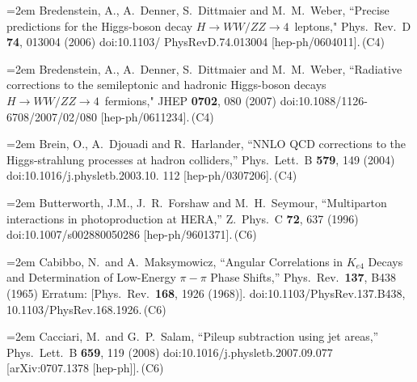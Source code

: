 \documentclass[letter,12pt]{article}
\def\xbibitem#1#2#3{\noindent\hangindent=2em #2\,(#3)}
\begin{document}
\xbibitem{Bredenstein:2006rh}{Bredenstein, A., A.~Denner, S.~Dittmaier and M.~M.~Weber,
  ``Precise predictions for the Higgs-boson decay $H\to WW/ZZ\to 4$\, leptons,"%
  Phys.\ Rev.\ D {\bf 74}, 013004 (2006)
  doi:10.1103/ PhysRevD.74.013004
  [hep-ph/0604011].}{C4}
  
\xbibitem{Bredenstein:2006ha}{Bredenstein, A., A.~Denner, S.~Dittmaier and M.~M.~Weber,
  ``Radiative corrections to the semileptonic and hadronic Higgs-boson decays $H\to WW/ZZ\to 4$\, fermions,"
  JHEP {\bf 0702}, 080 (2007)
  doi:10.1088/1126-6708/2007/02/080
  [hep-ph/0611234].}{C4}

\xbibitem{Brein:2003wg}{Brein, O., A.~Djouadi and R.~Harlander,
  ``NNLO QCD corrections to the Higgs-strahlung processes at hadron colliders,''
  Phys.\ Lett.\ B {\bf 579}, 149 (2004)
  doi:10.1016/j.physletb.2003.10. 112
  [hep-ph/0307206].}{C4}
    
\xbibitem{Butterworth:1996zw}{Butterworth, J.M., J.~R.~Forshaw and M.~H.~Seymour,
  ``Multiparton interactions in photoproduction at HERA,''
  Z.\ Phys.\ C {\bf 72}, 637 (1996)
  doi:10.1007/s002880050286
  [hep-ph/9601371].}{C6}

\xbibitem{Cabibbo:1965zzb}{Cabibbo, N.\ and A.~Maksymowicz,
  ``Angular Correlations in $K_{e4}$ Decays and Determination of Low-Energy $\pi-\pi$ Phase Shifts,''
  Phys.\ Rev.\  {\bf 137}, B438 (1965)
  Erratum: [Phys.\ Rev.\  {\bf 168}, 1926 (1968)].
  doi:10.1103/PhysRev.137.B438, 10.1103/PhysRev.168.1926.}{C6}
  
\xbibitem{Cacciari:2007fd}{Cacciari, M.\ and G.~P.~Salam,
  ``Pileup subtraction using jet areas,''
  Phys.\ Lett.\ B {\bf 659}, 119 (2008)
  doi:10.1016/j.physletb.2007.09.077
  [arXiv:0707.1378 [hep-ph]].}{C6}
  
\end{document}
